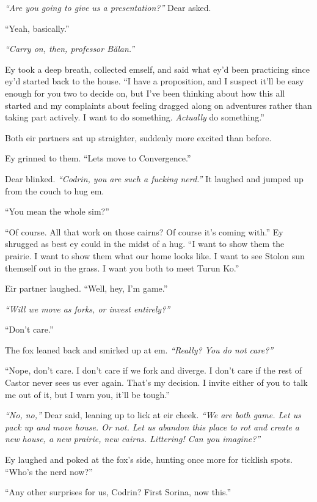 \emph{``Are you going to give us a presentation?''} Dear asked.

``Yeah, basically.''

\emph{``Carry on, then, professor Bălan.''}

Ey took a deep breath, collected emself, and said what ey'd been practicing since ey'd started back to the house. ``I have a proposition, and I suspect it'll be easy enough for you two to decide on, but I've been thinking about how this all started and my complaints about feeling dragged along on adventures rather than taking part actively. I want to do something. \emph{Actually} do something.''

Both eir partners sat up straighter, suddenly more excited than before.

Ey grinned to them. ``Lets move to Convergence.''

Dear blinked. \emph{``Codrin, you are such a fucking nerd.''} It laughed and jumped up from the couch to hug em.

``You mean the whole sim?''

``Of course. All that work on those cairns? Of course it's coming with.'' Ey shrugged as best ey could in the midst of a hug. ``I want to show them the prairie. I want to show them what our home looks like. I want to see Stolon sun themself out in the grass. I want you both to meet Turun Ko.''

Eir partner laughed. ``Well, hey, I'm game.''

\emph{``Will we move as forks, or invest entirely?''}

``Don't care.''

The fox leaned back and smirked up at em. \emph{``Really? You do not care?''}

``Nope, don't care. I don't care if we fork and diverge. I don't care if the rest of Castor never sees us ever again. That's my decision. I invite either of you to talk me out of it, but I warn you, it'll be tough.''

\emph{``No, no,''} Dear said, leaning up to lick at eir cheek. \emph{``We are both game. Let us pack up and move house. Or not. Let us abandon this place to rot and create a new house, a new prairie, new cairns. Littering! Can you imagine?''}

Ey laughed and poked at the fox's side, hunting once more for ticklish spots. ``Who's the nerd now?''

``Any other surprises for us, Codrin? First Sorina, now this.''

